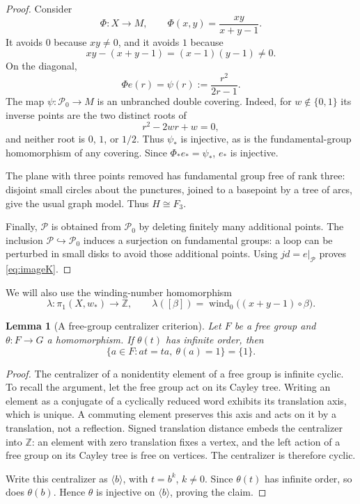 \documentclass[11pt]{article}
\newcommand{\Z}{\mathbb Z}
\newcommand{\Par}{\mathcal P}
\newcommand{\wind}{\operatorname{wind}}
\newtheorem{lemma}[theorem]{Lemma}
\theoremstyle{definition}
\theoremstyle{remark}
\begin{document}
\begin{proof}
Consider
\[
\Phi:X\longrightarrow M,\qquad
\Phi(x,y)=\frac{xy}{x+y-1}.
\]
It avoids $0$ because $xy\ne0$, and it avoids $1$ because
\[
xy-(x+y-1)=(x-1)(y-1)\ne0.
\]
On the diagonal,
\[
\Phi e(r)=\psi(r):=\frac{r^2}{2r-1}.
\]
The map $\psi:\Par_0\to M$ is an unbranched double covering.
Indeed, for $w\notin\{0,1\}$ its inverse points are the two distinct
roots of
\[
r^2-2wr+w=0,
\]
and neither root is $0$, $1$, or $1/2$.
Thus $\psi_*$ is injective, as is the fundamental-group homomorphism
of any covering.  Since $\Phi_*e_*=\psi_*$, $e_*$ is injective.

The plane with three points removed has fundamental group free of
rank three: disjoint small circles about the punctures, joined to a
basepoint by a tree of arcs, give the usual graph model.
Thus $H\cong F_3$.

Finally, $\Par$ is obtained from $\Par_0$ by deleting finitely many
additional points.  The inclusion $\Par\hookrightarrow\Par_0$
induces a surjection on fundamental groups: a loop can be perturbed
in small disks to avoid those additional points.
Using $jd=e|_{\Par}$ proves \eqref{eq:imageK}.
\end{proof}

We will also use the winding-number homomorphism
\begin{equation}\label{eq:lambda}
\lambda:\pi_1(X,w_*)\longrightarrow\Z,\qquad
\lambda([\beta])=\wind_0\bigl((x+y-1)\circ\beta\bigr).
\end{equation}

\begin{lemma}[A free-group centralizer criterion]\label{lem:centralizer}
Let $F$ be a free group and $\theta:F\to G$ a homomorphism.
If $\theta(t)$ has infinite order, then
\[
\{a\in F:at=ta,\ \theta(a)=1\}=\{1\}.
\]
\end{lemma}

\begin{proof}
The centralizer of a nonidentity element of a free group is infinite
cyclic.  To recall the argument, let the free group act on its Cayley
tree.  Writing an element as a conjugate of a cyclically reduced word
exhibits its translation axis, which is unique.  A commuting element
preserves this axis and acts on it by a translation, not a reflection.
Signed translation distance embeds the centralizer into $\Z$:
an element with zero translation fixes a vertex, and the left action
of a free group on its Cayley tree is free on vertices.
The centralizer is therefore cyclic.

Write this centralizer as $\langle b\rangle$, with $t=b^k$, $k\ne0$.
Since $\theta(t)$ has infinite order, so does $\theta(b)$.
Hence $\theta$ is injective on $\langle b\rangle$, proving the claim.
\end{proof}
\end{document}
